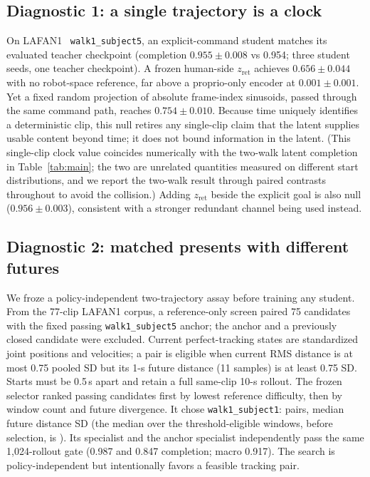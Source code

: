 \documentclass[conference]{IEEEtran}
\begin{document}
\subsection{Diagnostic 1: a single trajectory is a clock}
On LAFAN1~\cite{lafan1} \texttt{walk1\_subject5}, an explicit-command student matches its evaluated
teacher checkpoint (completion $0.955\pm0.008$ vs 0.954; three student seeds, one
teacher checkpoint).  A frozen human-side $z_{\mathrm{ret}}$ achieves
$0.656\pm0.044$ with no robot-space reference, far above a proprio-only encoder at
$0.001\pm0.001$.  Yet a fixed random projection of absolute frame-index sinusoids,
passed through the same command path, reaches $0.754\pm0.010$.  Because time
uniquely identifies a deterministic clip, this null retires any single-clip claim that
the latent supplies usable content beyond time; it does not bound information in the
latent.  (This single-clip clock value coincides numerically with the two-walk latent
completion in Table~\ref{tab:main}; the two are unrelated quantities measured on
different start distributions, and we report the two-walk result through paired contrasts
throughout to avoid the collision.)  Adding $z_{\mathrm{ret}}$ beside the explicit goal is also null
($0.956\pm0.003$), consistent with a stronger redundant channel being used instead.

\subsection{Diagnostic 2: matched presents with different futures}
We froze a policy-independent two-trajectory assay before training any student.  From
the 77-clip LAFAN1 corpus, a reference-only screen paired 75 candidates with the fixed
passing \texttt{walk1\_subject5} anchor; the anchor and a previously closed candidate
were excluded.  Current perfect-tracking states are
standardized joint positions and velocities; a pair is eligible when current RMS
distance is at most 0.75 pooled SD but its 1-s future distance (11 samples) is at least
0.75 SD.  Starts must be 0.5\,s apart and retain a full same-clip 10-s rollout.  The
frozen selector ranked passing candidates first by lowest reference difficulty, then by
window count and future divergence.  It chose \texttt{walk1\_subject1}: \ESelectedWindows{} pairs,
median future distance \ESelectedMedianFuture{} SD (the median over the \EEligibleWindows{}
threshold-eligible windows, before selection, is \EEligibleMedianFuture{}).
Its specialist and the anchor specialist independently
pass the same 1,024-rollout gate (0.987 and 0.847 completion; macro 0.917).  The search
is policy-independent but intentionally favors a feasible tracking pair.
\end{document}
